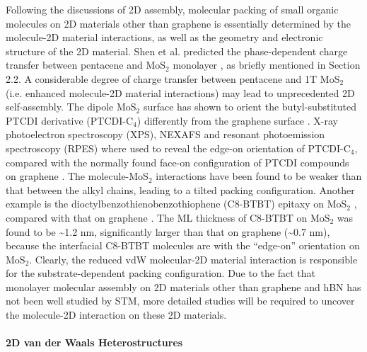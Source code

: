 Following the discussions of 2D assembly, molecular packing of small
organic molecules on 2D materials other than graphene is essentially
determined by the molecule-2D material interactions, as well as the
geometry and electronic structure of the 2D material. Shen et
al. predicted the phase-dependent charge transfer between pentacene
and MoS\(_{\text{2}}\) monolayer \cite{Shen_2017_DFT_mos2_pent}, as briefly
mentioned in Section 2.2. A considerable degree of charge
transfer between pentacene and 1T MoS\(_{\text{2}}\) (i.e. enhanced molecule-2D
material interactions) may lead to unprecedented 2D self-assembly. The
dipole MoS\(_{\text{2}}\) surface has shown to orient the butyl-substituted PTCDI
derivative (PTCDI-C\(_{\text{4}}\)) differently from the graphene surface
\cite{Arramel_2017_Ptcdi_mos2}. X-ray photoelectron spectroscopy (XPS),
NEXAFS and resonant photoemission spectroscopy (RPES) where used to
reveal the edge-on orientation of PTCDI-C\(_{\text{4}}\), compared with the
normally found face-on configuration of PTCDI compounds on graphene
\cite{Karmel_2014_PTCDI_gr}. The molecule-MoS\(_{\text{2}}\) interactions have been
found to be weaker than that between the alkyl chains, leading to a
tilted packing configuration. Another example is the
dioctylbenzothienobenzothiophene (C8-BTBT) epitaxy on MoS\(_{\text{2}}\)
\cite{He_2015_C8BTBT_MoS2}, compared with that on graphene
\cite{He_2014_C8BTBT_gr}. The ML thickness of C8-BTBT on MoS\(_{\text{2}}\) was
found to be \textasciitilde{}1.2 nm, significantly larger than that on graphene (\textasciitilde{}0.7
nm), because the interfacial C8-BTBT molecules are with the ``edge-on''
orientation on MoS\(_{\text{2}}\). Clearly, the reduced vdW molecular-2D material
interaction is responsible for the substrate-dependent packing
configuration. Due to the fact that monolayer molecular assembly on 2D
materials other than graphene and hBN has not been well studied by
STM, more detailed studies will be required to uncover the molecule-2D
interaction on these 2D materials.

\paragraph{2D van der Waals Heterostructures}
\label{sec:org77ea5bc}

